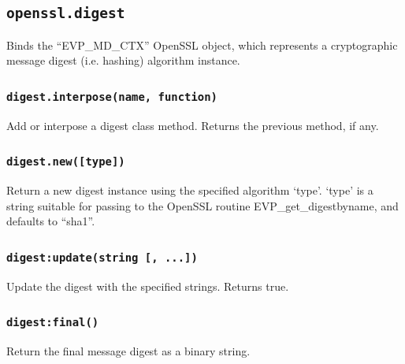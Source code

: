 \documentclass[11pt, oneside]{memoir}
\newcommand*{\fn}[1]{\texttt{#1}\xspace}
\newcounter{toccols}
\newenvironment{Module}[1]{
	\subsection{\texttt{#1}}
	\addtocontents{toc}{
		\protect\begin{multicols}{\value{toccols}}
	}
}{
	\addtocontents{toc}{\protect\end{multicols}}
}
\begin{document}
\begin{Module}{openssl.digest}

Binds the ``EVP\_MD\_CTX'' OpenSSL object, which represents a cryptographic message digest (i.e. hashing) algorithm instance.

\subsubsection[\fn{digest.interpose}]{\fn{digest.interpose(name, function)}}

Add or interpose a digest class method. Returns the previous method, if any.

\subsubsection[\fn{digest.new}]{\fn{digest.new([type])}}

Return a new digest instance using the specified algorithm `type'. `type' is a string suitable for passing to the OpenSSL routine EVP\_get\_digestbyname, and defaults to ``sha1''.

\subsubsection[\fn{digest:update}]{\fn{digest:update(string [, ...])}}

Update the digest with the specified strings. Returns true.

\subsubsection[\fn{digest:final}]{\fn{digest:final()}}

Return the final message digest as a binary string.

\end{Module}
\end{document}

